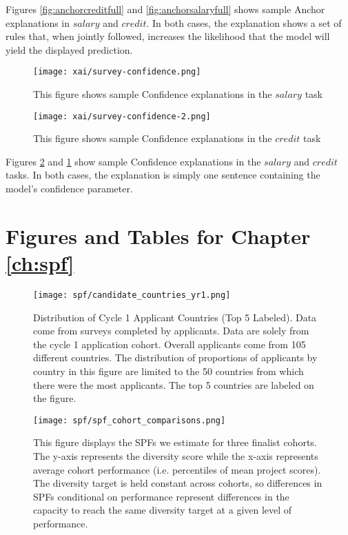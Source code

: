 Figures \ref{fig:anchorcreditfull} and \ref{fig:anchorsalaryfull} shows sample Anchor explanations in $salary$ and $credit$. In both cases, the explanation shows a set of rules that, when jointly followed, increases the likelihood that the model will yield the displayed prediction.

\begin{figure}[htbp]
    \centering
    \texttt{[image: xai/survey-confidence.png]}
    \caption{This figure shows sample Confidence explanations in the $salary$ task}
    \label{fig:confidencesalaryfull}
\end{figure}

\begin{figure}[hbtp]
    \centering
    \texttt{[image: xai/survey-confidence-2.png]}
    \caption{This figure shows sample Confidence explanations in the $credit$ task}
    \label{fig:confidencecreditfull}
\end{figure}

Figures \ref{fig:confidencecreditfull} and \ref{fig:confidencesalaryfull} show sample Confidence explanations in the $salary$ and $credit$ tasks. In both cases, the explanation is simply one sentence containing the model's confidence parameter.


\section{Figures and Tables for Chapter \ref{ch:spf}}

    \begin{figure}[!htb]
    \centering
        \caption{Distribution of Cycle 1 Applicant Countries (Top 5 Labeled). Data come from surveys completed by applicants. Data are solely from the cycle 1 application cohort. Overall applicants come from 105 different countries. The distribution of proportions of applicants by country in this figure are limited to the 50 countries from which there were the most applicants. The top 5 countries are labeled on the figure. }\label{fig:dist_countryies_c1}
      \texttt{[image: spf/candidate\_countries\_yr1.png]} 
    \end{figure}
    
    
    \newpage
    \begin{figure}[!htb]
    \centering
        \caption{ This figure displays the SPFs we estimate for three finalist cohorts. The y-axis represents the diversity score while the x-axis represents average cohort performance (i.e. percentiles of mean project scores). The diversity target is held constant across cohorts, so differences in SPFs conditional on performance represent differences in the capacity to reach the same diversity target at a given level of performance.}\label{fig:diversity_across_cohorts}
      \texttt{[image: spf/spf\_cohort\_comparisons.png]} 
    \end{figure}
    
